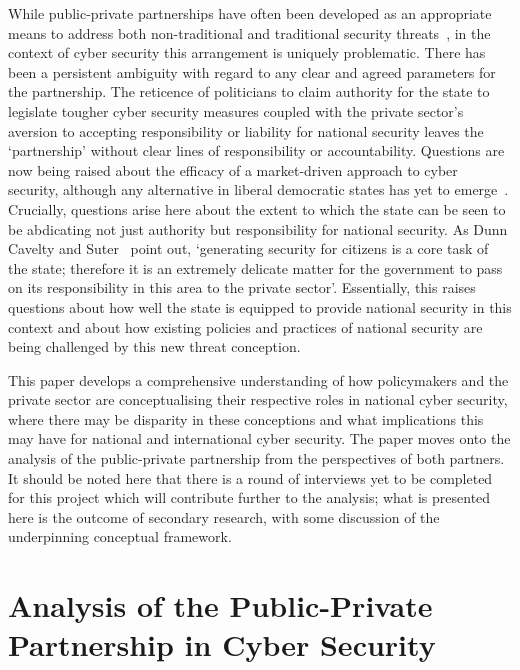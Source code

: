 \documentclass[a4paper,11pt]{article}
\begin{document}
While public-private partnerships have often been developed as an
appropriate means to address both non-traditional and traditional
security threats~\cite{manwaring:2002,usdoc:2012}, in the context of
cyber security this arrangement is uniquely problematic. There has
been a persistent ambiguity with regard to any clear and agreed
parameters for the partnership. The reticence of politicians to claim
authority for the state to legislate tougher cyber security measures
coupled with the private sector's aversion to accepting responsibility
or liability for national security leaves the `partnership' without
clear lines of responsibility or accountability. Questions are now
being raised about the efficacy of a market-driven approach to cyber
security, although any alternative in liberal democratic states has
yet to emerge~\cite{obama:2009}. Crucially, questions arise here about
the extent to which the state can be seen to be abdicating not just
authority but responsibility for national security. As Dunn Cavelty
and Suter~\cite{dunncavelty+suter:2009} point out, `generating
security for citizens is a core task of the state; therefore it is an
extremely delicate matter for the government to pass on its
responsibility in this area to the private sector'.  Essentially, this
raises questions about how well the state is equipped to provide
national security in this context and about how existing policies and
practices of national security are being challenged by this new threat
conception.

This paper develops a comprehensive understanding of how policymakers
and the private sector are conceptualising their respective roles in
national cyber security, where there may be disparity in these
conceptions and what implications this may have for national and
international cyber security. The paper moves onto the analysis of the
public-private partnership from the perspectives of both partners. It
should be noted here that there is a round of interviews yet to be
completed for this project which will contribute further to the
analysis; what is presented here is the outcome of secondary research,
with some discussion of the underpinning conceptual framework.

\section{Analysis of the Public-Private Partnership in Cyber Security}
\end{document}
